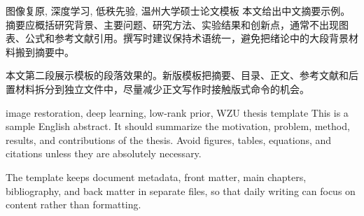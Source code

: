 \begin{chineseabstract}{图像复原, 深度学习, 低秩先验, 温州大学硕士论文模板}
本文给出中文摘要示例。摘要应概括研究背景、主要问题、研究方法、实验结果和创新点，通常不出现图表、公式和参考文献引用。撰写时建议保持术语统一，避免把绪论中的大段背景材料搬到摘要中。

本文第二段展示模板的段落效果的。新版模板把摘要、目录、正文、参考文献和后置材料拆分到独立文件中，尽量减少正文写作时接触版式命令的机会。
\end{chineseabstract}

\begin{englishabstract}{image restoration, deep learning, low-rank prior, WZU thesis template}
This is a sample English abstract. It should summarize the motivation, problem, method, results, and contributions of the thesis. Avoid figures, tables, equations, and citations unless they are absolutely necessary.

The template keeps document metadata, front matter, main chapters, bibliography, and back matter in separate files, so that daily writing can focus on content rather than formatting.
\end{englishabstract}
